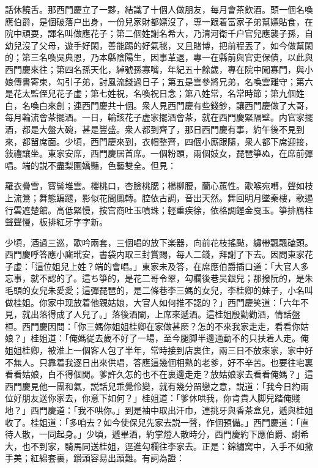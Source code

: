 話休饒舌。那西門慶立了一夥，結識了十個人做朋友，每月會茶飲酒。頭一個名喚應伯爵，是個破落户出身，一份兒家財都嫖沒了，專一跟着富家子弟幫嫖貼食，在院中頑耍，諢名叫做應花子；第二個姓謝名希大，乃清河衛千户官兒應襲子孫，自幼兒沒了父母，遊手好閑，善能踢的好氣毬，又且賭博，把前程丟了，如今做幫閑的；第三名喚吳典恩，乃本縣陰陽生，因事革退，專一在縣前與官吏保債，以此與西門慶來往；第四名孫天化，綽號孫寡嘴，年紀五十餘歲，專在院中闖寡門，與小娘傳書寄柬，勾引子弟，討風流錢過日子；第五是雲參將兄弟，名喚雲離守；第六是花太監侄兒花子虚；第七姓祝，名喚祝日念；第八姓常，名常時節；第九個姓白，名喚白來創；連西門慶共十個。衆人見西門慶有些錢鈔，讓西門慶做了大哥，每月輪流會茶擺酒。一日，輪該花子虚家擺酒會茶，就在西門慶緊隔壁。内官家擺酒，都是大盤大碗，甚是豐盛。衆人都到齊了，那日西門慶有事，約午後不見到來，都㽞席面。少頃，西門慶來到，衣帽整齊，四個小廝跟隨，衆人都下席迎接，敍禮讓坐。東家安席，西門慶居首席。一個粉頭，兩個妓女，琵琶箏ぬ，在席前彈唱。端的説不盡梨園嬌豔，色藝雙全。但見：

羅衣疊雪，寳髻堆雲。櫻桃口，杏臉桃腮；楊柳腰，蘭心蕙性。歌喉宛囀，聲如枝上流鶯；舞態蹁躚，影似花間鳳轉。腔依古調，音出天然。舞回明月墜秦樓，歌遏行雲遮楚館。高低緊慢，按宫商吐玉噴珠；輕重疾徐，依格調鏗金戛玉。箏排鴈柱聲聲慢，板排紅牙字字新。

少頃，酒過三巡，歌吟兩套，三個唱的放下楽器，向前花枝搖颭，繡帶飄飄磕頭。西門慶呼答應小廝玳安，書袋内取三封賞賜，每人二錢，拜謝了下去。因問東家花子虚：「這位姐兒上姓？端的會唱。」東家未及答，在席應伯爵插口道：「大官人多忘事，就不認的了。這ち箏的，是花二哥令翠，勾欄後巷吴銀兒；那撥阮的，是朱毛頭的女兒朱愛愛；這彈琵琶的，是二條巷李三媽的女兒，李桂卿的妹子，小名叫做桂姐。你家中现放着他親姑娘，大官人如何推不認的？」西門慶笑道：「六年不見，就出落得成了人兒了。」落後酒闌，上席來遞酒。這桂姐殷勤勸酒，情話盤桓。西門慶因問：「你三媽你姐姐桂卿在家做甚麽？怎的不來我家走走，看看你姑娘？」桂姐道：「俺媽従去歲不好了一場，至今腿脚半邊通動不的只扶着人走。俺姐姐桂卿，被淮上一個客人包了半年，常時接到店裏住，兩三日不放來家，家中好不無人。只靠着我逐日出來供唱，答應這幾個相熟的老爹，好不辛苦。也要往宅裏看看姑娘，白不得個閒。爹許久怎的也不在裏邊走走？放姑娘家去看看俺媽？」這西門慶見他一團和氣，説話兒乖覺伶變，就有幾分㽞戀之意，説道：「我今日約兩位好朋友送你家去，你意下如何？」桂姐道：「爹休哄我，你肯貴人脚兒踏俺賤地？」西門慶道：「我不哄你。」到是袖中取出汗巾，連挑牙與香茶盒兒，遞與桂姐收了。桂姐道：「多咱去？如今使保兒先家去説一聲，作個預備。」西門慶道：「直待人散，一同起身。」少頃，遞畢酒，約掌燈人散時分，西門慶約下應伯爵、謝希大，也不到家，騎馬同送桂姐，逕進勾欄往李家去。正是：錦繡窝中，入手不如撒手美；紅綿套裏，鑚頭容易出頭難。有詞為證：

